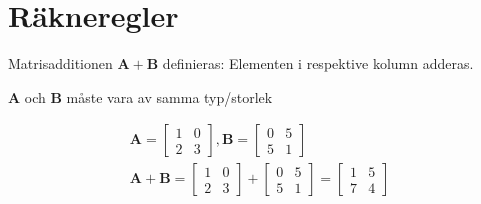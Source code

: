 \section{Räkneregler} %
\label{sec:r_kneregler}
Matrisadditionen $\mathbf{A} + \mathbf{B}$ definieras: Elementen i respektive kolumn adderas.
\begin{Rem}
    \textbf{A} och \textbf{B} måste vara av samma typ/storlek
\end{Rem}
\newpage
\begin{Ex}
    \begin{gather*}
    	\mathbf{A} = \begin{bmatrix} 1&0\\2&3 \end{bmatrix}, \mathbf{B} = \begin{bmatrix} 0&5\\5&1 \end{bmatrix}\\
    	\mathbf{A} + \mathbf{B} = \begin{bmatrix} 1&0\\2&3 \end{bmatrix} + \begin{bmatrix} 0&5\\5&1 \end{bmatrix} = \begin{bmatrix} 1&5\\7&4 \end{bmatrix}
    \end{gather*}
\end{Ex}

